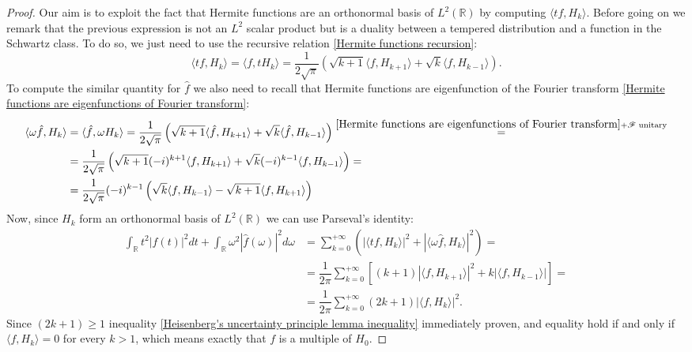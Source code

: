 \documentclass[corpo=11pt, stile=classica, tipotesi=custom,
greek, evenboxes, english]{toptesi}
\numberwithin{equation}{chapter}
\theoremstyle{remark}
\newcommand{\R}{\mathbb{R}} %
\newcommand{\F}{\mathscr{F}} %
\begin{document}
\begin{proof}
	Our aim is to exploit the fact that Hermite functions are an orthonormal basis of $L^2(\R)$ by computing $\langle tf, H_k\rangle$. {\color{red} Before going on we remark that the previous expression is not an $L^2$ scalar product but is a duality between a tempered distribution and a function in the Schwartz class}. To do so, we just need to use the recursive relation \eqref{Hermite functions recursion}:
	\begin{equation*}
		\langle tf, H_k \rangle = \langle f, tH_k \rangle = \dfrac{1}{2\sqrt{\pi}} \left( \sqrt{k+1} \langle f, H_{k+1} \rangle+ \sqrt{k}\langle f,H_{k-1}\rangle \right).
	\end{equation*}
	To compute the similar quantity for $\hat{f}$ we also need to recall that Hermite functions are eigenfunction of the Fourier transform \eqref{Hermite functions are eigenfunctions of Fourier transform}:
	\begin{align*}
		\langle \omega \hat{f}, H_k \rangle &= \langle \hat{f}, \omega H_k \rangle = \dfrac{1}{2\sqrt{\pi}} \left( \sqrt{k+1} \langle \hat{f}, H_{k+1} \rangle + \sqrt{k}\langle \hat{f},H_{k-1}\rangle \right) \overset{\eqref{Hermite functions are eigenfunctions of Fourier transform} + \F\;\mathrm{unitary}}{=} \\
											&= \dfrac{1}{2\sqrt{\pi}} \left( \sqrt{k+1} (-i)^{k+1}\langle f, H_{k+1} \rangle + \sqrt{k}(-i)^{k-1}\langle f,H_{k-1}\rangle \right)=\\
											&= \dfrac{1}{2\sqrt{\pi}} (-i)^{k-1} \left( \sqrt{k}\langle f,H_{k-1}\rangle - \sqrt{k+1} \langle f, H_{k+1} \rangle  \right)
	\end{align*}
	Now, since $H_k$ form an orthonormal basis of $L^2(\R)$ we can use Parseval's identity:
	\begin{align*}
		\int_{\R} t^2 |f(t)|^2dt + \int_{\R} \omega^2 |\hat{f}(\omega)|^2d\omega &= \sum_{k=0}^{+\infty} \left( |\langle tf, H_k \rangle|^2 + |\langle \omega \hat{f}, H_k\rangle|^2 \right) = \\
								 											     &= \dfrac{1}{2\pi}\sum_{k=0}^{+\infty} \left[ (k+1)|\langle f,H_{k+1}\rangle|^2 + k|\langle f,H_{k-1}\rangle| \right] = \\
								 											     &= \dfrac{1}{2\pi}\sum_{k=0}^{+\infty} (2k+1)|\langle f,H_k\rangle|^2.
	\end{align*}	
	Since $(2k+1) \geq 1$ inequality \eqref{Heisenberg's uncertainty principle lemma inequality} immediately proven, and equality hold if and only if $\langle f,H_k \rangle = 0$ for every $k > 1$, which means exactly that $f$ is a multiple of $H_0$.
\end{proof}
\end{document}
